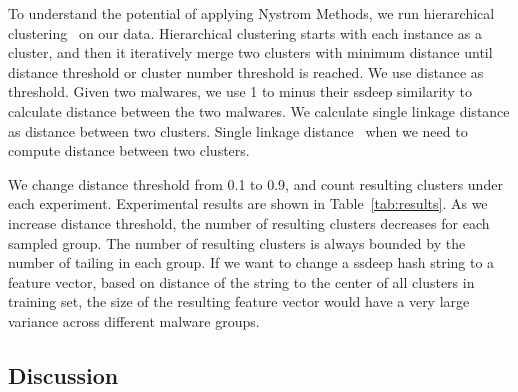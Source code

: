 To understand the potential of applying Nystrom Methods, we run hierarchical clustering~\cite{hcluster} on our data.
Hierarchical clustering starts with each instance as a cluster, 
and then it iteratively merge two clusters with minimum distance 
until distance threshold or cluster number threshold is reached. 
We use distance as threshold. 
Given two malwares, 
we use 1 to minus their ssdeep similarity to calculate distance between the two malwares. 
We calculate single linkage distance as distance between two clusters. 
Single linkage
distance~\cite{single-link} when we need to compute distance between two clusters. 

We change distance threshold from 0.1 to 0.9, 
and count resulting clusters under each experiment. 
Experimental results are shown in Table~\ref{tab:results}. 
As we increase distance threshold, the number of resulting clusters decreases for each sampled group. 
The number of resulting clusters is always bounded by the number of tailing in each group. 
If we want to change a ssdeep hash string to a feature vector, 
based on distance of the string to the center of all clusters in training set, 
the size of the resulting feature vector would have a very large variance across different malware groups. 





\subsection{Discussion}

